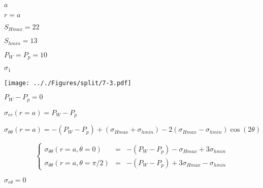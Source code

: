 \documentclass[onecolumn,11pt]{report}
\def\lthtmlcheckvsize{\ifdim\ht\sizebox<\vsize 
  \ifdim\wd\sizebox<\hsize\expandafter\hfill\fi \expandafter\vfill
  \else\expandafter\vss\fi}%
\begin{document}
{\newpage\clearpage
{}%
$ a$%
\lthtmlindisplaymathZ
\lthtmlcheckvsize\clearpage}

{\newpage\clearpage
{}%
$ r=a$%
\lthtmlindisplaymathZ
\lthtmlcheckvsize\clearpage}

{\newpage\clearpage
{}%
$ S_{Hmax}=22$%
\lthtmlindisplaymathZ
\lthtmlcheckvsize\clearpage}

{\newpage\clearpage
{}%
$ S_{hmin}=13$%
\lthtmlindisplaymathZ
\lthtmlcheckvsize\clearpage}

{\newpage\clearpage
{}%
$ P_W=P_p=10$%
\lthtmlindisplaymathZ
\lthtmlcheckvsize\clearpage}

{\newpage\clearpage
{}%
$ \sigma_{1}$%
\lthtmlindisplaymathZ
\lthtmlcheckvsize\clearpage}

{\newpage\clearpage
{}%
\texttt{[image: .././Figures/split/7-3.pdf]}%
\lthtmlpictureZ
\lthtmlcheckvsize\clearpage}

{\newpage\clearpage
{}%
$ P_W-P_p = 0$%
\lthtmlindisplaymathZ
\lthtmlcheckvsize\clearpage}

{\newpage\clearpage
{}%
$\displaystyle \sigma_{rr}(r=a) = P_W - P_p$%
\lthtmlindisplaymathZ
\lthtmlcheckvsize\clearpage}

{\newpage\clearpage
{}%
$\displaystyle \sigma_{\theta \theta} (r=a) =
-(P_W - P_p) +(\sigma_{Hmax}+\sigma_{hmin})
-2(\sigma_{Hmax}-\sigma_{hmin}) \cos (2\theta)$%
\lthtmlindisplaymathZ
\lthtmlcheckvsize\clearpage}

{\newpage\clearpage
{}%
\begin{displaymath}\left\lbrace
\begin{array}{rcl}
\sigma_{\theta \theta} (r=a,\theta=0) & = &
-(P_W - P_p) -\sigma_{Hmax} + 3\sigma_{hmin} \\
\sigma_{\theta \theta} (r=a,\theta=\pi/2) & = &
-(P_W - P_p) +3\sigma_{Hmax} -\sigma_{hmin}
\end{array}
\right.\end{displaymath}%
\lthtmldisplayZ
\lthtmlcheckvsize\clearpage}

{\newpage\clearpage
{}%
$ \sigma_{r \theta} = 0$%
\lthtmlindisplaymathZ
\lthtmlcheckvsize\clearpage}
\end{document}
